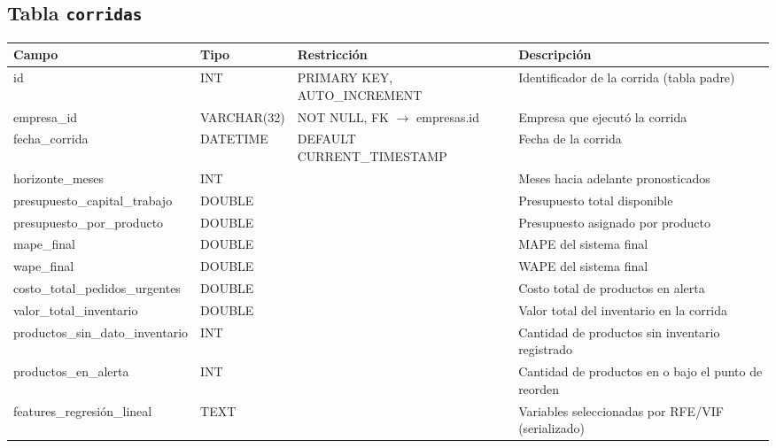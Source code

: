 \subsection*{Tabla \texttt{corridas}}
\begin{table}[H]
\centering
\renewcommand{\arraystretch}{1.3}
\begin{tabularx}{\textwidth}{|>{\raggedright\arraybackslash}p{3.0cm}|l|>{\raggedright\arraybackslash}p{3.2cm}|X|}
\hline
\textbf{Campo} & \textbf{Tipo} & \textbf{Restricción} & \textbf{Descripción} \\
\hline
id & INT & PRIMARY KEY, AUTO\_\discretionary{}{}{}INCREMENT & Identificador de la corrida (tabla padre) \\
\hline
empresa\_\discretionary{}{}{}id & VARCHAR(32) & NOT NULL, FK $\to$ empresas.id & Empresa que ejecutó la corrida \\
\hline
fecha\_\discretionary{}{}{}corrida & DATETIME & DEFAULT CURRENT\_\discretionary{}{}{}TIMESTAMP & Fecha de la corrida \\
\hline
horizonte\_\discretionary{}{}{}meses & INT & & Meses hacia adelante pronosticados \\
\hline
presupuesto\_\discretionary{}{}{}capital\_\discretionary{}{}{}trabajo & DOUBLE & & Presupuesto total disponible \\
\hline
presupuesto\_\discretionary{}{}{}por\_\discretionary{}{}{}producto & DOUBLE & & Presupuesto asignado por producto \\
\hline
mape\_\discretionary{}{}{}final & DOUBLE & & MAPE del sistema final \\
\hline
wape\_\discretionary{}{}{}final & DOUBLE & & WAPE del sistema final \\
\hline
costo\_\discretionary{}{}{}total\_\discretionary{}{}{}pedidos\_\discretionary{}{}{}urgentes & DOUBLE & & Costo total de productos en alerta \\
\hline
valor\_\discretionary{}{}{}total\_\discretionary{}{}{}inventario & DOUBLE & & Valor total del inventario en la corrida \\
\hline
productos\_\discretionary{}{}{}sin\_\discretionary{}{}{}dato\_\discretionary{}{}{}inventario & INT & & Cantidad de productos sin inventario registrado \\
\hline
productos\_\discretionary{}{}{}en\_\discretionary{}{}{}alerta & INT & & Cantidad de productos en o bajo el punto de reorden \\
\hline
features\_\discretionary{}{}{}regresión\_\discretionary{}{}{}lineal & TEXT & & Variables seleccionadas por RFE/VIF (serializado) \\
\hline
\end{tabularx}
\end{table}


